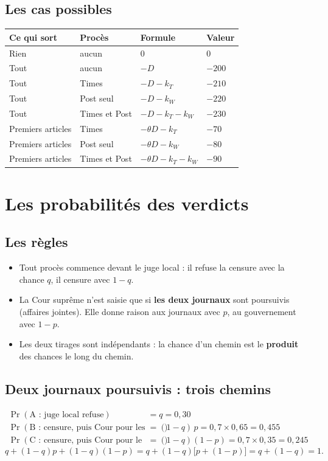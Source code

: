 \documentclass[11pt,a4paper]{article}
\theoremstyle{definition}
\begin{document}
\subsection{Les cas possibles}
\begin{center}
\small
\begin{tabular}{@{}llll@{}}
\toprule
Ce qui sort & Procès & Formule & Valeur \\
\midrule
Rien & aucun & $0$ & $0$ \\
Tout & aucun & $-D$ & $-200$ \\
Tout & Times & $-D-k_T$ & $-210$ \\
Tout & Post seul & $-D-k_W$ & $-220$ \\
Tout & Times et Post & $-D-k_T-k_W$ & $-230$ \\
Premiers articles & Times & $-\theta D-k_T$ & $-70$ \\
Premiers articles & Post seul & $-\theta D-k_W$ & $-80$ \\
Premiers articles & Times et Post & $-\theta D-k_T-k_W$ & $-90$ \\
\bottomrule
\end{tabular}
\end{center}

\section{Les probabilités des verdicts}

\subsection{Les règles}
\begin{itemize}[leftmargin=*,itemsep=1pt]
\item Tout procès commence devant le juge local : il refuse la censure avec la chance $q$, il censure avec $1-q$.
\item La Cour suprême n'est saisie que si \textbf{les deux journaux} sont poursuivis (affaires jointes). Elle donne raison aux journaux avec $p$, au gouvernement avec $1-p$.
\item Les deux tirages sont indépendants : la chance d'un chemin est le \textbf{produit} des chances le long du chemin.
\end{itemize}

\subsection{Deux journaux poursuivis : trois chemins}
\begin{align*}
\Pr(\text{A : juge local refuse}) &= q = 0,30\\
\Pr(\text{B : censure, puis Cour pour les journaux}) &= (1-q)\,p = 0,7\times0,65 = 0,455\\
\Pr(\text{C : censure, puis Cour pour le gouvernement}) &= (1-q)(1-p) = 0,7\times0,35 = 0,245
\end{align*}
\[
q+(1-q)p+(1-q)(1-p)=q+(1-q)\big[p+(1-p)\big]=q+(1-q)=1 .
\]
\end{document}
